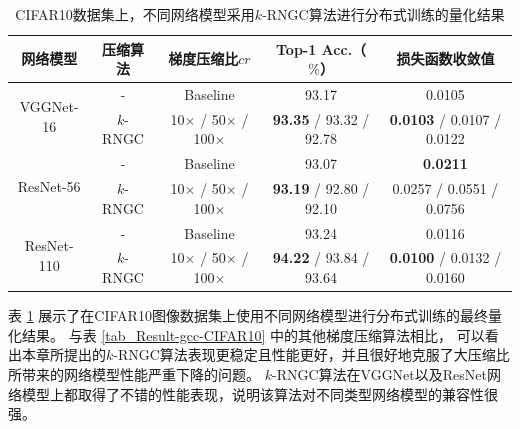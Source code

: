 \documentclass{xdupgthesis}
\begin{document}
\renewcommand{\arraystretch}{1.3}
\begin{table}[ht]
    \centering
    \begin{threeparttable}
        \caption{CIFAR10数据集上，不同网络模型采用$k$-RNGC算法进行分布式训练的量化结果}
        \label{tab_Result-k-rngc-CIFAR10}
        \begin{tabular}{c|c|c|c|c}
            \toprule
            \toprule
            网络模型 & 压缩算法 & 梯度压缩比$cr$ & Top-1 Acc.（$\%$） & 损失函数收敛值 \\ 
            \midrule
            \multirow{2}{*}{VGGNet-16} & - & Baseline & 93.17 & 0.0105 \\
                & $k$-RNGC & 10$\times$ / 50$\times$ / 100$\times$ & \textbf{93.35} / 93.32 / 92.78 & \textbf{0.0103} / 0.0107 / 0.0122 \\
            \midrule 
            \multirow{2}{*}{ResNet-56} & - & Baseline & 93.07 & \textbf{0.0211} \\
                & $k$-RNGC & 10$\times$ / 50$\times$ / 100$\times$ & \textbf{93.19} / 92.80 / 92.10 & 0.0257 / 0.0551 / 0.0756 \\
            \midrule
            \multirow{2}{*}{ResNet-110} & - & Baseline & 93.24 & 0.0116 \\
             & $k$-RNGC & 10$\times$ / 50$\times$ / 100$\times$ & \textbf{94.22} / 93.84 / 93.64 & \textbf{0.0100} / 0.0132 / 0.0160 \\
            \bottomrule
            \bottomrule
        \end{tabular}
    \end{threeparttable}
\end{table}

表 \ref*{tab_Result-k-rngc-CIFAR10} 展示了在CIFAR10图像数据集上使用不同网络模型进行分布式训练的最终量化结果。
与表 \ref*{tab_Result-gcc-CIFAR10} 中的其他梯度压缩算法相比，
可以看出本章所提出的$k$-RNGC算法表现更稳定且性能更好，并且很好地克服了大压缩比所带来的网络模型性能严重下降的问题。
$k$-RNGC算法在VGGNet以及ResNet网络模型上都取得了不错的性能表现，说明该算法对不同类型网络模型的兼容性很强。
\end{document}
